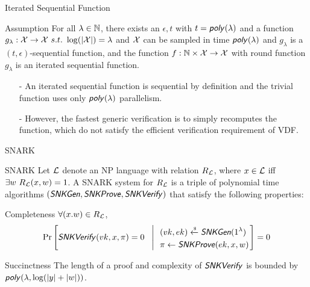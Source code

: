 \documentclass[UTF8]{beamer}
\begin{document}
	\begin{frame}{Iterated Sequential Function}
		\begin{block}{Assumption}
			For all $\lambda\in\mathbb{N}$, there exists an $\epsilon,t$ with $t=\textsf{\textit{poly}}(\lambda)$ and a function $g_\lambda:\mathcal{X}\to \mathcal{X}~s.t.~\log(|\mathcal{X}|)=\lambda$ and $\mathcal{X}$ can be sampled in time $\textsf{\textit{poly}}(\lambda)$ and $g_\lambda$ is a $(t,\epsilon)$-sequential function, and the function $f:\mathbb{N}\times\mathcal{X}\to\mathcal{X}$ with round function $g_\lambda$ is an iterated sequential function.
		\end{block}
		\begin{block}{}
			\begin{itemize}
				\item [-] An iterated sequential function is sequential by definition and the trivial function uses only $\textsf{\textit{poly}}(\lambda)$ parallelism.
				\item [-] However, the fastest generic verification is to simply recomputes the function, which do not satisfy the efficient verification requirement of VDF.
			\end{itemize}
		\end{block}
	\end{frame}
	\begin{frame}{SNARK}
		\begin{block}{SNARK}
			Let $\mathcal{L}$ denote an NP language with relation $R_{\mathcal{L}}$, where $x\in\mathcal{L}$ iff $\exists w~R_{\mathcal{L}}(x,w)=1$. A SNARK system for $R_{\mathcal{L}}$ is a triple of polynomial time algorithms $(\textsf{\textit{SNKGen}},\textsf{\textit{SNKProve}},\textsf{\textit{SNKVerify}})$ that satisfy the following properties:
		\end{block}
		\begin{block}{Completeness}
			$\forall(x.w)\in R_{\mathcal{L}}$,
			\begin{equation*}
				\Pr\left[
				\textsf{\textit{SNKVerify}}(vk,x,\pi)=0
				~~\left|~~
				\begin{aligned}
					&(vk,ek)\xleftarrow{\text{\tiny$\mathsf{\$}$}}\textsf{\textit{SNKGen}}(1^\lambda)\\
					&\pi\gets\textsf{\textit{SNKProve}}(ek,x,w)
				\end{aligned}
				\right.\right]=0
			\end{equation*}
		\end{block}
		\begin{block}{Succinctness}
			The length of a proof and complexity of $\textsf{\textit{SNKVerify}}$ is bounded by $\textsf{\textit{poly}}(\lambda,\log(|y|+|w|))$.
		\end{block}
	\end{frame}
\end{document}
